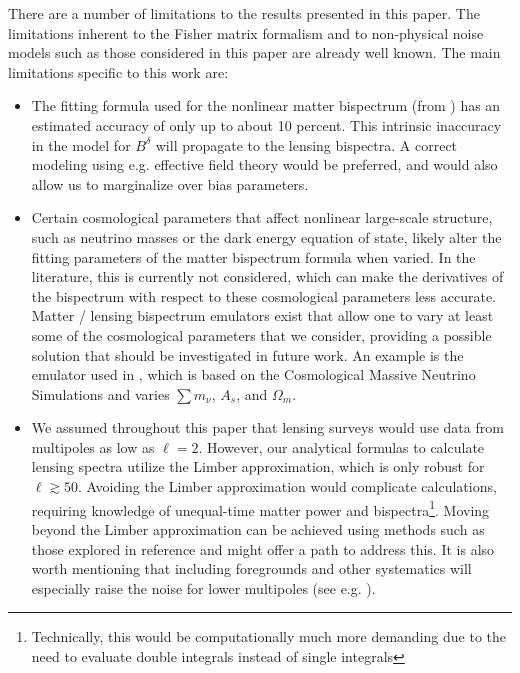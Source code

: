 \documentclass[11pt]{article} %
\begin{document}
There are a number of limitations to the results presented in this paper. The limitations inherent to the Fisher matrix formalism and to non-physical noise models such as those considered in this paper are already well known. The main limitations specific to this work are:
\begin{itemize}
     \item The fitting formula used for the nonlinear matter bispectrum (from \cite{bispfit}) has an estimated accuracy of only up to about 10 percent. This intrinsic inaccuracy in the model for $B^{\delta}$ will propagate to the lensing bispectra. A correct modeling using e.g. effective field theory would be preferred, and would also allow us to marginalize over bias parameters. 
     
     \item Certain cosmological parameters that affect nonlinear large-scale structure, such as neutrino masses or the dark energy equation of state, likely alter the fitting parameters of the matter bispectrum formula when varied. In the literature, this is currently not considered, which can make the derivatives of the bispectrum with respect to these cosmological parameters less accurate. Matter / lensing bispectrum emulators exist that allow one to vary at least some of the cosmological parameters that we consider, providing a possible solution that should be investigated in future work. An example is the emulator used in \cite{Coulton_2019}, which is based on the Cosmological Massive Neutrino Simulations \cite{Liu_2018} and varies $\sum m_{\nu}$, $A_s$, and $\Omega_m$.
     
     \item We assumed throughout this paper that lensing surveys would use data from multipoles as low as $\ell = 2$.  However, our analytical formulas to calculate lensing spectra utilize the Limber approximation, which is only robust for $\ell \gtrsim 50$. Avoiding the Limber approximation would complicate calculations, requiring knowledge of unequal-time matter power and bispectra\footnote{Technically, this would be computationally much more demanding due to the need to evaluate double integrals instead of single integrals}. Moving beyond the Limber approximation can be achieved using methods such as those explored in reference \cite{Chen:2021vba} and might offer a path to address this. It is also worth mentioning that including foregrounds and other systematics will especially raise the noise for lower multipoles (see e.g. \cite{de_Oliveira_Costa_2006}).


\end{itemize}
\end{document}
